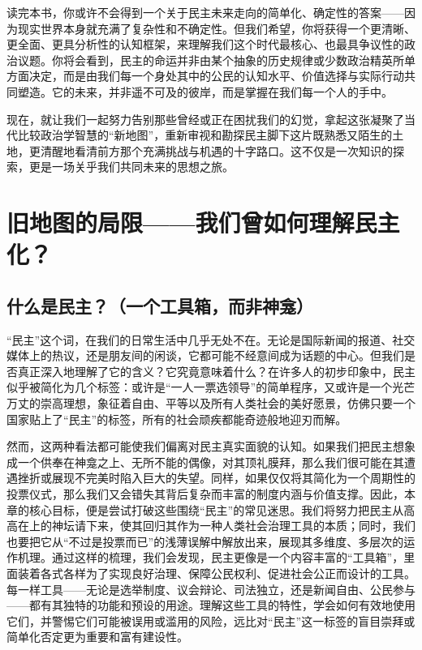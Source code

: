 \documentclass[UTF8, 10pt]{ctexbook}
\begin{document}
读完本书，你或许不会得到一个关于民主未来走向的简单化、确定性的答案——因为现实世界本身就充满了复杂性和不确定性。但我们希望，你将获得一个更清晰、更全面、更具分析性的认知框架，来理解我们这个时代最核心、也最具争议性的政治议题。你将会看到，民主的命运并非由某个抽象的历史规律或少数政治精英所单方面决定，而是由我们每一个身处其中的公民的认知水平、价值选择与实际行动共同塑造。它的未来，并非遥不可及的彼岸，而是掌握在我们每一个人的手中。

现在，就让我们一起努力告别那些曾经或正在困扰我们的幻觉，拿起这张凝聚了当代比较政治学智慧的“新地图”，重新审视和勘探民主脚下这片既熟悉又陌生的土地，更清醒地看清前方那个充满挑战与机遇的十字路口。这不仅是一次知识的探索，更是一场关乎我们共同未来的思想之旅。
\mainmatter
\part{旧地图的局限——我们曾如何理解民主化？}

\chapter{什么是民主？（一个工具箱，而非神龛）}

\lettrine[lines=3]{“}{民主”}这个词，在我们的日常生活中几乎无处不在。无论是国际新闻的报道、社交媒体上的热议，还是朋友间的闲谈，它都可能不经意间成为话题的中心。但我们是否真正深入地理解了它的含义？它究竟意味着什么？在许多人的初步印象中，民主似乎被简化为几个标签：或许是“一人一票选领导”的简单程序，又或许是一个光芒万丈的崇高理想，象征着自由、平等以及所有人类社会的美好愿景，仿佛只要一个国家贴上了“民主”的标签，所有的社会顽疾都能奇迹般地迎刃而解。

然而，这两种看法都可能使我们偏离对民主真实面貌的认知。如果我们把民主想象成一个供奉在神龛之上、无所不能的偶像，对其顶礼膜拜，那么我们很可能在其遭遇挫折或展现不完美时陷入巨大的失望。同样，如果仅仅将其简化为一个周期性的投票仪式，那么我们又会错失其背后复杂而丰富的制度内涵与价值支撑。因此，本章的核心目标，便是尝试打破这些围绕“民主”的常见迷思。我们将努力把民主从高高在上的神坛请下来，使其回归其作为一种人类社会治理工具的本质；同时，我们也要把它从“不过是投票而已”的浅薄误解中解放出来，展现其多维度、多层次的运作机理。通过这样的梳理，我们会发现，民主更像是一个内容丰富的“工具箱”，里面装着各式各样为了实现良好治理、保障公民权利、促进社会公正而设计的工具。每一样工具——无论是选举制度、议会辩论、司法独立，还是新闻自由、公民参与——都有其独特的功能和预设的用途。理解这些工具的特性，学会如何有效地使用它们，并警惕它们可能被误用或滥用的风险，远比对“民主”这一标签的盲目崇拜或简单化否定更为重要和富有建设性。
\end{document}
